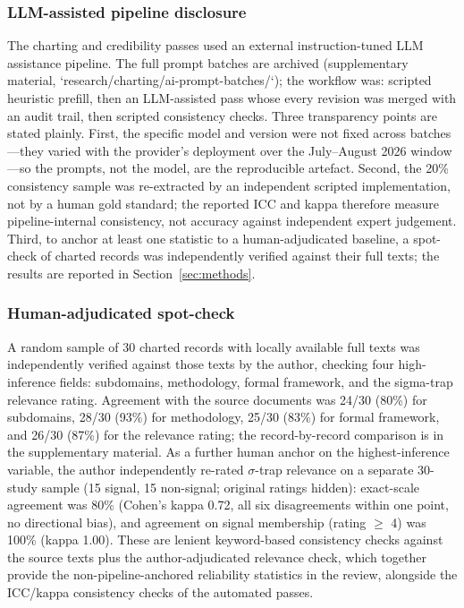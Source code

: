 \subsubsection{LLM-assisted pipeline disclosure}
The charting and credibility passes used an external instruction-tuned LLM assistance pipeline. The full prompt batches are archived (supplementary material, `research/charting/ai-prompt-batches/`); the workflow was: scripted heuristic prefill, then an LLM-assisted pass whose every revision was merged with an audit trail, then scripted consistency checks. Three transparency points are stated plainly. First, the specific model and version were not fixed across batches---they varied with the provider's deployment over the July--August 2026 window---so the prompts, not the model, are the reproducible artefact. Second, the 20\% consistency sample was re-extracted by an independent scripted implementation, not by a human gold standard; the reported ICC and kappa therefore measure pipeline-internal consistency, not accuracy against independent expert judgement. Third, to anchor at least one statistic to a human-adjudicated baseline, a spot-check of charted records was independently verified against their full texts; the results are reported in Section~\ref{sec:methods}.

\subsubsection{Human-adjudicated spot-check}
A random sample of 30 charted records with locally available full texts was independently verified against those texts by the author, checking four high-inference fields: subdomains, methodology, formal framework, and the sigma-trap relevance rating. Agreement with the source documents was 24/30 (80\%) for subdomains, 28/30 (93\%) for methodology, 25/30 (83\%) for formal framework, and 26/30 (87\%) for the relevance rating; the record-by-record comparison is in the supplementary material. As a further human anchor on the highest-inference variable, the author independently re-rated $\sigma$-trap relevance on a separate 30-study sample (15 signal, 15 non-signal; original ratings hidden): exact-scale agreement was 80\% (Cohen's kappa 0.72, all six disagreements within one point, no directional bias), and agreement on signal membership (rating $\geq$ 4) was 100\% (kappa 1.00). These are lenient keyword-based consistency checks against the source texts plus the author-adjudicated relevance check, which together provide the non-pipeline-anchored reliability statistics in the review, alongside the ICC/kappa consistency checks of the automated passes.


